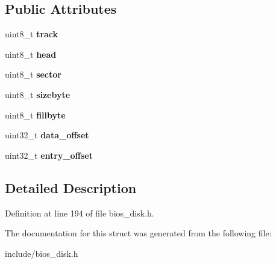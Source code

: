 \subsection*{Public Attributes}
\begin{DoxyCompactItemize}
\item 
\hypertarget{structimageDiskVFD_1_1vfdentry_a584716a3b21efbb6fb92e6d4a9fd30bf}{uint8\-\_\-t {\bfseries track}}\label{structimageDiskVFD_1_1vfdentry_a584716a3b21efbb6fb92e6d4a9fd30bf}

\item 
\hypertarget{structimageDiskVFD_1_1vfdentry_a4a98505e2f0be19cf7a7a6df5e5ea4a8}{uint8\-\_\-t {\bfseries head}}\label{structimageDiskVFD_1_1vfdentry_a4a98505e2f0be19cf7a7a6df5e5ea4a8}

\item 
\hypertarget{structimageDiskVFD_1_1vfdentry_ab2db645ccdbcbc76267db774f486b972}{uint8\-\_\-t {\bfseries sector}}\label{structimageDiskVFD_1_1vfdentry_ab2db645ccdbcbc76267db774f486b972}

\item 
\hypertarget{structimageDiskVFD_1_1vfdentry_a1f299aea35eccb67232f2f72eb3472b1}{uint8\-\_\-t {\bfseries sizebyte}}\label{structimageDiskVFD_1_1vfdentry_a1f299aea35eccb67232f2f72eb3472b1}

\item 
\hypertarget{structimageDiskVFD_1_1vfdentry_a7bb993c2cfaef8d5b06749015f821986}{uint8\-\_\-t {\bfseries fillbyte}}\label{structimageDiskVFD_1_1vfdentry_a7bb993c2cfaef8d5b06749015f821986}

\item 
\hypertarget{structimageDiskVFD_1_1vfdentry_ae3f61135f4078782c64c798ca905b9df}{uint32\-\_\-t {\bfseries data\-\_\-offset}}\label{structimageDiskVFD_1_1vfdentry_ae3f61135f4078782c64c798ca905b9df}

\item 
\hypertarget{structimageDiskVFD_1_1vfdentry_ac9240537467abe687506ac21be081991}{uint32\-\_\-t {\bfseries entry\-\_\-offset}}\label{structimageDiskVFD_1_1vfdentry_ac9240537467abe687506ac21be081991}

\end{DoxyCompactItemize}


\subsection{Detailed Description}


Definition at line 194 of file bios\-\_\-disk.\-h.



The documentation for this struct was generated from the following file\-:\begin{DoxyCompactItemize}
\item 
include/bios\-\_\-disk.\-h\end{DoxyCompactItemize}
